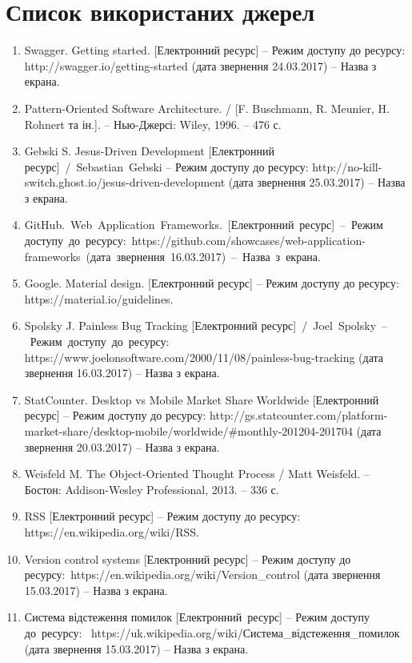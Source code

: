 \chapter*{Список використаних джерел}

\begin{enumerate}
	\item Swagger. Getting started. [Електронний ресурс] – Режим доступу до ресурсу: http://swagger.io/getting-started (дата звернення 24.03.2017) – Назва з екрана.
	\item Pattern-Oriented Software Architecture. / [F. Buschmann, R. Meunier, H. Rohnert та ін.]. – Нью-Джерсі: Wiley, 1996. – 476 с.
	\item Gebski S. Jesus-Driven Development [Електронний ресурс]~/~Sebastian~Gebski – Режим доступу до ресурсу: http://no-kill-switch.ghost.io/jesus-driven-development (дата звернення 25.03.2017) – Назва з екрана.
	\item GitHub.~Web~Application~Frameworks.~[Електронний~ресурс]~–~Режим доступу~до~ресурсу:~https://github.com/showcases/web-application-frameworks~(дата~звернення~16.03.2017)~–~Назва~з~екрана.
	\item Google. Material design. [Електронний ресурс] – Режим доступу до ресурсу: https://material.io/guidelines.
	\item Spolsky J. Painless Bug Tracking [Електронний ресурс]~/~Joel~Spolsky~–~Режим~доступу~до~ресурсу: https://www.joelonsoftware.com/2000/11/08/painless-bug-tracking (дата звернення 16.03.2017) – Назва з екрана.
	\item StatCounter. Desktop vs Mobile Market Share Worldwide [Електронний ресурс] – Режим доступу до ресурсу: http://gs.statcounter.com/platform-market-share/desktop-mobile/worldwide/\#monthly-201204-201704 (дата звернення 20.03.2017) – Назва з екрана.
	\item Weisfeld M. The Object-Oriented Thought Process / Matt Weisfeld. – Бостон: Addison-Wesley Professional, 2013. – 336 с.
	\item RSS [Електронний ресурс] – Режим доступу до ресурсу: https://en.wikipedia.org/wiki/RSS.
	\item Version control systems [Електронний ресурс] – Режим доступу до ресурсу:~https://en.wikipedia.org/wiki/Version\_control (дата звернення 15.03.2017) – Назва з екрана.
	\item Система відстеження помилок [Електронний~ресурс] – Режим доступу до~ресурсу:~ https://uk.wikipedia.org/wiki/Система\_відстеження\_помилок (дата звернення 15.03.2017) – Назва з екрана.

\end{enumerate}
